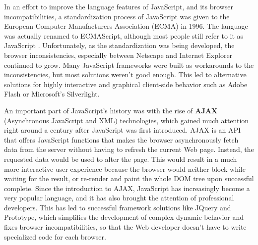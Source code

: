 In an effort to improve the language features of JavaScript, and its browser incompatibilities, a standardization process of JavaScript was given to the European Computer Manufacturers Association (ECMA) in 1996. The language was actually renamed to ECMAScript, although most people still refer to it as JavaScript \cite{jshist}. Unfortunately, as the standardization was being developed, the browser inconsistencies, especially between Netscape and Internet Explorer continued to grow. Many JavaScript frameworks were built as workarounds to the inconsistencies, but most solutions weren't good enough. This led to alternative solutions for highly interactive and graphical client-side behavior such as Adobe Flash\cite{flash} or Microsoft's Silverlight\cite{silverlight}. 

An important part of JavaScript's history was with the rise of \textbf{AJAX} (Asynchronous JavaScript and XML) technologies\cite{ajax}, which gained much attention right around a century after JavaScript was first introduced. AJAX is an API that offers JavaScript functions that makes the browser asynchronously fetch data from the server without having to refresh the current Web page. Instead, the requested data would be used to alter the  page. This would result in a much more interactive user experience because the browser would neither block while waiting for the result, or re-render and paint the whole DOM tree upon successful complete. Since the introduction to AJAX, JavaScript has increasingly become a very popular language, and it has also brought the attention of professional developers. This has led to successful framework solutions like JQuery\cite{jquery} and Prototype\cite{prototype}, which simplifies the development of complex dynamic behavior and fixes browser incompatibilities, so that the Web developer doesn't have to write specialized code for each browser.

